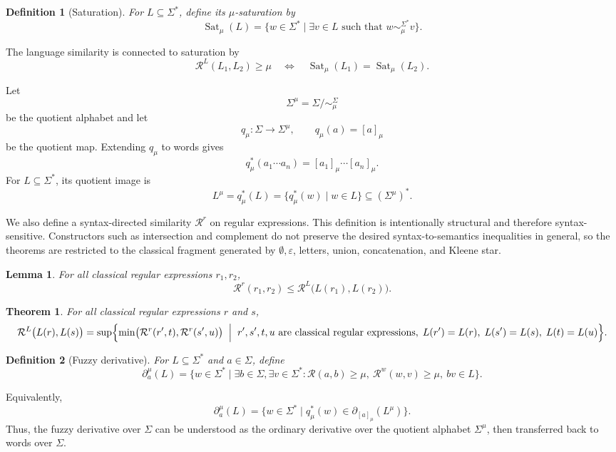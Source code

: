 \documentclass{easychair}
\newtheorem{definition}{Definition}
\newtheorem{theorem}{Theorem}
\newtheorem{lemma}{Lemma}
\begin{document}
\begin{definition}[Saturation]
For $L\subseteq\Sigma^\ast$, define its $\mu$-saturation by
\[
\operatorname{Sat}_\mu(L)
=
\{w\in\Sigma^\ast\mid
\exists v\in L \text{ such that } w\sim_\mu^{\Sigma^\ast}v\}.
\]
\end{definition}

The language similarity is connected to saturation by
\[
\mathcal R^L(L_1,L_2)\ge\mu
\quad\Longleftrightarrow\quad
\operatorname{Sat}_\mu(L_1)=\operatorname{Sat}_\mu(L_2).
\]

Let
\[
\Sigma^\mu=\Sigma/{\sim_\mu^\Sigma}
\]
be the quotient alphabet and let
\[
q_\mu:\Sigma\to\Sigma^\mu,\qquad q_\mu(a)=[a]_\mu
\]
be the quotient map. Extending $q_\mu$ to words gives
\[
q_\mu^\ast(a_1\cdots a_n)
=
[a_1]_\mu\cdots[a_n]_\mu.
\]
For $L\subseteq\Sigma^\ast$, its quotient image is
\[
L^\mu
=
q_\mu^\ast(L)
=
\{q_\mu^\ast(w)\mid w\in L\}
\subseteq(\Sigma^\mu)^\ast.
\]

We also define a syntax-directed similarity $\mathcal R^r$ on regular
expressions. This definition is intentionally structural and therefore
syntax-sensitive. Constructors such as intersection and complement do not preserve the
desired syntax-to-semantics inequalities in general, so the theorems are restricted to the classical fragment generated by $\emptyset,\varepsilon$,
letters, union, concatenation, and Kleene star.

\begin{lemma}
For all classical regular expressions $r_1,r_2$,
\[
\mathcal{R}^r(r_1,r_2)
\le
\mathcal{R}^L\bigl(L(r_1),L(r_2)\bigr).
\]
\end{lemma}

\begin{theorem}
For all classical regular expressions $r$ and $s$,
\[
\mathcal{R}^L\bigl(L(r),L(s)\bigr)
=
\sup\Bigl\{
\min\bigl(
\mathcal{R}^r(r',t),
\mathcal{R}^r(s',u)
\bigr)
\;\Bigm|\;
r',s',t,u
\text{ are classical regular expressions},
\;
L(r')=L(r),
\;
L(s')=L(s),
\;
L(t)=L(u)
\Bigr\}.
\]
\end{theorem}


\begin{definition}[Fuzzy derivative]
For $L\subseteq\Sigma^\ast$ and $a\in\Sigma$, define
\[
\partial_a^\mu(L)
=
\{w\in\Sigma^\ast\mid
\exists b\in\Sigma,\exists v\in\Sigma^\ast:
\mathcal R(a,b)\ge\mu,\ 
\mathcal R^w(w,v)\ge\mu,\ 
bv\in L
\}.
\]
\end{definition}

Equivalently,
\[
\partial_a^\mu(L)
=
\{w\in\Sigma^\ast\mid
q_\mu^\ast(w)\in
\partial_{[a]_\mu}(L^\mu)\}.
\]
Thus, the fuzzy derivative over $\Sigma$ can be understood as the ordinary
derivative over the quotient alphabet $\Sigma^\mu$, then transferred back to
words over $\Sigma$.
\end{document}
